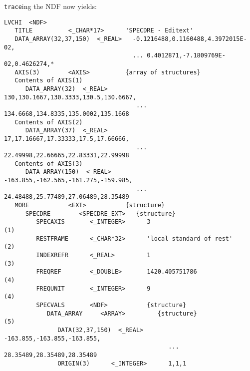\goodbreak
\normalsize
{\tt trace}ing the NDF now yields:
\small
\begin{verbatim}
LVCHI  <NDF>
   TITLE          <_CHAR*17>      'SPECDRE - Editext'
   DATA_ARRAY(32,37,150)  <_REAL>   -0.1216488,0.1160488,4.3972015E-02,
                                    ... 0.4012871,-7.1809769E-02,0.4626274,*
   AXIS(3)        <AXIS>          {array of structures}
   Contents of AXIS(1)
      DATA_ARRAY(32)  <_REAL>        130,130.1667,130.3333,130.5,130.6667,
                                     ... 134.6668,134.8335,135.0002,135.1668
   Contents of AXIS(2)
      DATA_ARRAY(37)  <_REAL>        17,17.16667,17.33333,17.5,17.66666,
                                     ... 22.49998,22.66665,22.83331,22.99998
   Contents of AXIS(3)
      DATA_ARRAY(150)  <_REAL>       -163.855,-162.565,-161.275,-159.985,
                                     ... 24.48488,25.77489,27.06489,28.35489
   MORE           <EXT>           {structure}
      SPECDRE        <SPECDRE_EXT>   {structure}
         SPECAXIS       <_INTEGER>      3                                   (1)
         RESTFRAME      <_CHAR*32>      'local standard of rest'            (2)
         INDEXREFR      <_REAL>         1                                   (3)
         FREQREF        <_DOUBLE>       1420.405751786                      (4)
         FREQUNIT       <_INTEGER>      9                                   (4)
         SPECVALS       <NDF>           {structure}
            DATA_ARRAY     <ARRAY>         {structure}                      (5)
               DATA(32,37,150)  <_REAL>       -163.855,-163.855,-163.855,
                                              ... 28.35489,28.35489,28.35489
               ORIGIN(3)      <_INTEGER>      1,1,1
 

\end{verbatim}
